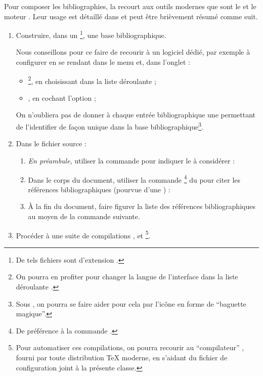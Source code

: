 Pour composer les bibliographies, la \gzt{} recourt aux outils modernes que sont
le  et le moteur . Leur usage est détaillé dans
\autocite{Bitouze} et peut être brièvement résumé comme suit.
\begin{enumerate}
\item Construire, dans un \footnote{De tels
    fichiers sont d'extension .}, une base bibliographique.

  Nous conseillons pour ce faire de recourir à un logiciel dédié, par exemple
  \href{http://jabref.sourceforge.net/}{} à configurer en se
  rendant dans le menu  et, dans l'onglet :
  \begin{itemize}
  \item {}\footnote{On pourra en profiter pour changer la langue de
      l'interface dans la liste déroulante .}, en choisissant
     dans la liste déroulante  ;
  \item {}, en cochant l'option  ;
  \end{itemize}

  On n'oubliera pas de donner à chaque entrée bibliographique une 
  permettant de l'identifier de façon unique dans la base
  bibliographique\footnote{Sous , on pourra se faire aider pour
    cela par l'icône en forme de \enquote{baguette magique}.}.
\item Dans le fichier source  :
  \begin{enumerate}
  \item \emph{En préambule}, utiliser la commande 
    pour indiquer le  à considérer :
\begin{preamblecode}
".bib}
\end{preamblecode}
  \item Dans le corps du document, utiliser la commande
    \footnote{De préférence à la commande
      .} du  pour citer les références
    bibliographiques (pourvue d'une ) :
  \item À la fin du document, faire figurer la liste des références
    bibliographiques au moyen de la commande 
    suivante.
  \end{enumerate}
\item Procéder à une suite de compilations ,  et
  \footnote{Pour automatiser ces compilations, on pourra
    recourir au \enquote{compilateur} , fourni par toute
    distribution \TeX{} moderne, en s'aidant du fichier de configuration
     joint à la présente classe.}.
\end{enumerate}

